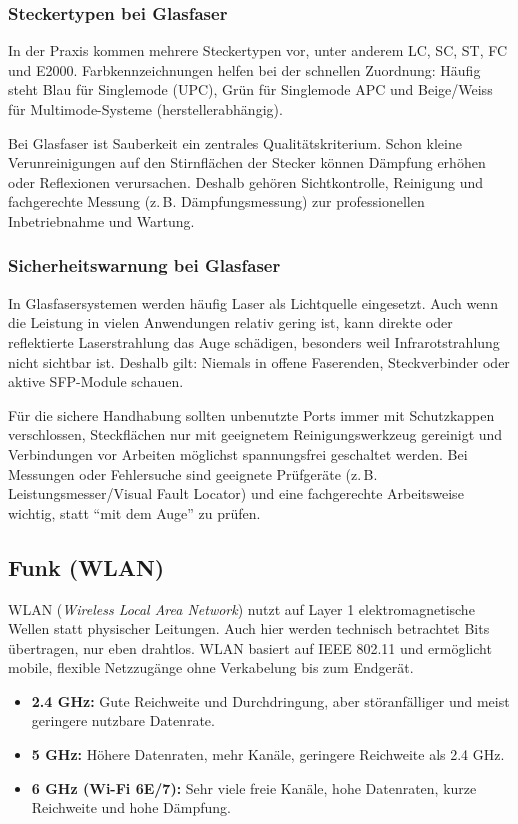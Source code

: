 \documentclass[11pt, oneside, numbers=nönddot]{scrbook}
\begin{document}
\subsubsection{Steckertypen bei Glasfaser}
In der Praxis kommen mehrere Steckertypen vor, unter anderem LC, SC, ST, FC und E2000. Farbkennzeichnungen helfen bei der schnellen Zuordnung: Häufig steht Blau für Singlemode (UPC), Grün für Singlemode APC und Beige/Weiss für Multimode-Systeme (herstellerabhängig).

Bei Glasfaser ist Sauberkeit ein zentrales Qualitätskriterium. Schon kleine Verunreinigungen auf den Stirnflächen der Stecker können Dämpfung erhöhen oder Reflexionen verursachen. Deshalb gehören Sichtkontrolle, Reinigung und fachgerechte Messung (z.\,B. Dämpfungsmessung) zur professionellen Inbetriebnahme und Wartung.

\subsubsection{Sicherheitswarnung bei Glasfaser}
In Glasfasersystemen werden häufig Laser als Lichtquelle eingesetzt. Auch wenn die Leistung in vielen Anwendungen relativ gering ist, kann direkte oder reflektierte Laserstrahlung das Auge schädigen, besonders weil Infrarotstrahlung nicht sichtbar ist. Deshalb gilt: Niemals in offene Faserenden, Steckverbinder oder aktive SFP-Module schauen.

Für die sichere Handhabung sollten unbenutzte Ports immer mit Schutzkappen verschlossen, Steckflächen nur mit geeignetem Reinigungswerkzeug gereinigt und Verbindungen vor Arbeiten möglichst spannungsfrei geschaltet werden. Bei Messungen oder Fehlersuche sind geeignete Prüfgeräte (z.\,B. Leistungsmesser/Visual Fault Locator) und eine fachgerechte Arbeitsweise wichtig, statt ``mit dem Auge'' zu prüfen.
\newpage
\subsection{Funk (WLAN)}
WLAN (\textit{Wireless Local Area Network}) nutzt auf Layer 1 elektromagnetische Wellen statt physischer Leitungen. Auch hier werden technisch betrachtet Bits übertragen, nur eben drahtlos. WLAN basiert auf IEEE 802.11 und ermöglicht mobile, flexible Netzzugänge ohne Verkabelung bis zum Endgerät.
\begin{itemize}
\item \textbf{2.4 GHz:} Gute Reichweite und Durchdringung, aber störanfälliger und meist geringere nutzbare Datenrate.
\item \textbf{5 GHz:} Höhere Datenraten, mehr Kanäle, geringere Reichweite als 2.4 GHz.
\item \textbf{6 GHz (Wi-Fi 6E/7):} Sehr viele freie Kanäle, hohe Datenraten, kurze Reichweite und hohe Dämpfung.
\end{itemize}
\end{document}
